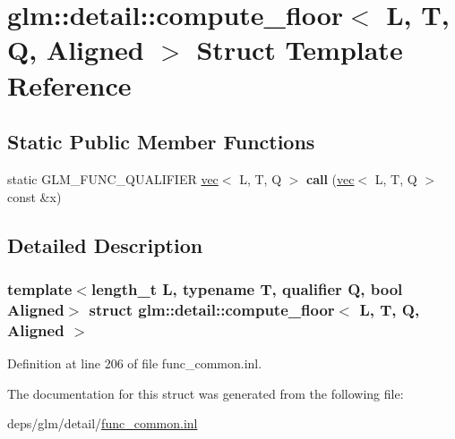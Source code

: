 \hypertarget{structglm_1_1detail_1_1compute__floor}{}\section{glm\+:\+:detail\+:\+:compute\+\_\+floor$<$ L, T, Q, Aligned $>$ Struct Template Reference}
\label{structglm_1_1detail_1_1compute__floor}
\subsection*{Static Public Member Functions}
\begin{DoxyCompactItemize}
\item 
\mbox{\label{structglm_1_1detail_1_1compute__floor_aa34d64f5823c463b6358bd11038d320e}} 
static G\+L\+M\+\_\+\+F\+U\+N\+C\+\_\+\+Q\+U\+A\+L\+I\+F\+I\+ER \hyperlink{structglm_1_1vec}{vec}$<$ L, T, Q $>$ {\bfseries call} (\hyperlink{structglm_1_1vec}{vec}$<$ L, T, Q $>$ const \&x)
\end{DoxyCompactItemize}


\subsection{Detailed Description}
\subsubsection*{template$<$length\+\_\+t L, typename T, qualifier Q, bool Aligned$>$\newline
struct glm\+::detail\+::compute\+\_\+floor$<$ L, T, Q, Aligned $>$}



Definition at line 206 of file func\+\_\+common.\+inl.



The documentation for this struct was generated from the following file\+:\begin{DoxyCompactItemize}
\item 
deps/glm/detail/\hyperlink{func__common_8inl}{func\+\_\+common.\+inl}\end{DoxyCompactItemize}
